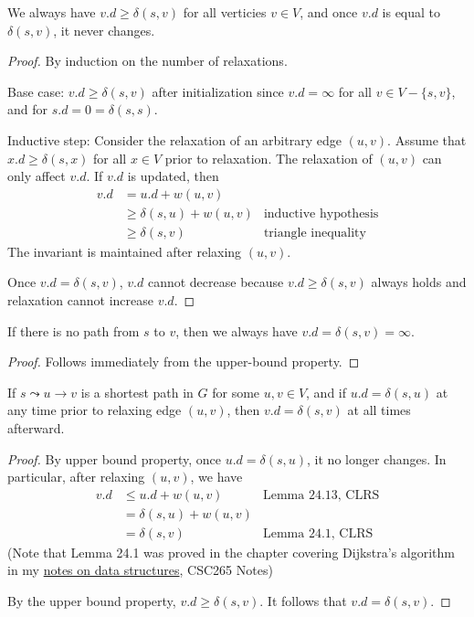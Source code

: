 \begin{lemma} 
    We always have $v.d \geq \delta(s,v)$ for all verticies $v \in V$, and once $v.d$ is equal to $\delta(s,v)$, it never changes.
\end{lemma}
\begin{proof}
    By induction on the number of relaxations.

    Base case: $v.d \geq \delta(s,v)$ after initialization since $v.d = \infty$ for all $v \in V - \{s,v\}$, and for $s.d = 0 = \delta(s,s)$.

    Inductive step: Consider the relaxation of an arbitrary edge $(u,v)$. Assume that $x.d \geq \delta(s,x)$ for all $x \in V$ prior to relaxation. The relaxation of $(u,v)$ can only affect $v.d$. If $v.d$ is updated, then
    $$
    \begin{aligned}
        v.d &= u.d + w(u,v) \\
        &\geq \delta(s,u) + w(u,v) & \text{inductive hypothesis} \\
        &\geq \delta(s,v) & \text{triangle inequality}
    \end{aligned}
    $$
    The invariant is maintained after relaxing $(u,v)$.

    Once $v.d = \delta(s,v)$, $v.d$ cannot decrease because $v.d \geq \delta(s,v)$ always holds and relaxation cannot increase $v.d$.
\end{proof}

\begin{lemma} 
    If there is no path from $s$ to $v$, then we always have $v.d = \delta(s,v) = \infty$.
\end{lemma}
\begin{proof}
    Follows immediately from the upper-bound property.
\end{proof}

\begin{lemma} 
    If $s \leadsto u \to v$ is a shortest path in $G$ for some $u,v \in V$, and if $u.d = \delta(s,u)$ at any time prior to relaxing edge $(u,v)$, then $v.d = \delta(s,v)$ at all times afterward.
\end{lemma}
\begin{proof}
    By upper bound property, once $u.d = \delta(s,u)$, it no longer changes. In particular, after relaxing $(u,v)$, we have
    $$
    \begin{aligned}
        v.d &\leq u.d + w(u,v) & \text{Lemma 24.13, CLRS} \\
        &= \delta(s,u) + w(u,v) \\
        &= \delta(s,v) & \text{Lemma 24.1, CLRS}
    \end{aligned}
    $$
    (Note that Lemma 24.1 was proved in the chapter covering Dijkstra's algorithm in my \href{https://github.com/gaojunxuan/data_struct_notes}{\color{ocre}notes on data structures}, CSC265 Notes)
    
    By the upper bound property, $v.d \geq \delta(s,v)$. It follows that $v.d = \delta(s,v)$.
\end{proof}


